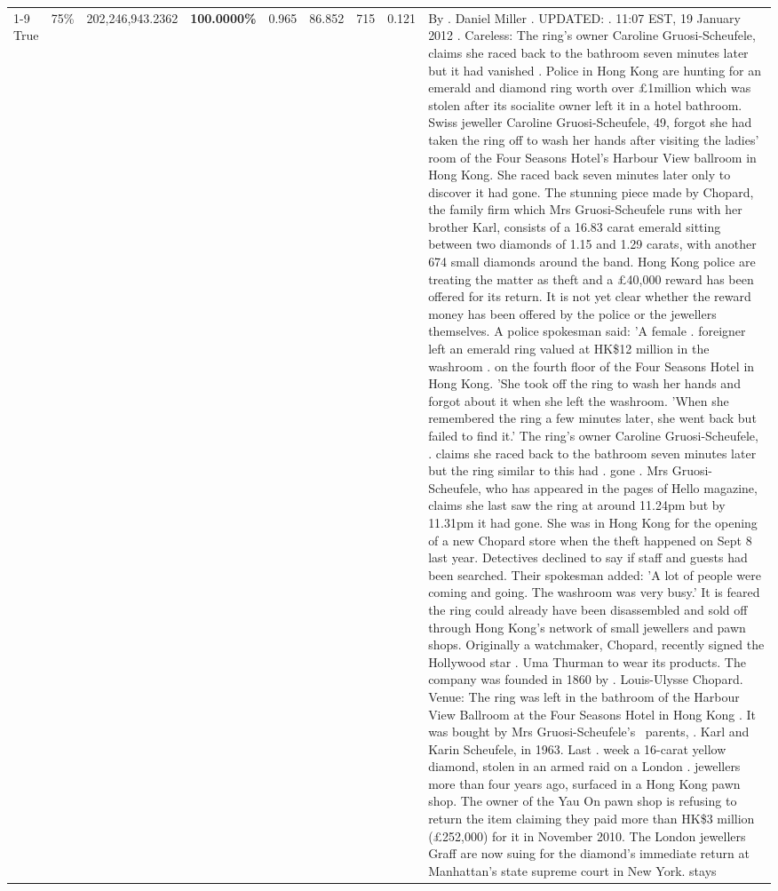 \begin{table}[H]
\begin{tabular}{lllrlllll}
\cline{1-9} \cline{2-9}
True & 75\% & 202,246,943.2362 & \bfseries \color{red} 100.0000\% & 0.965 & 86.852 & 715 & 0.121 & By . Daniel Miller . UPDATED: . 11:07 EST, 19 January 2012 . Careless: The ring's owner Caroline Gruosi-Scheufele, claims she raced back to the bathroom seven minutes later but it had vanished . Police in Hong Kong are hunting for an emerald and diamond ring worth over £1million which was stolen after its socialite owner left it in a hotel bathroom. Swiss jeweller Caroline Gruosi-Scheufele, 49, forgot she had taken the ring off to wash her hands after visiting the ladies' room of the Four Seasons Hotel's Harbour View ballroom in Hong Kong. She raced back seven minutes later only to discover it had gone. The stunning piece made by Chopard, the family firm which Mrs Gruosi-Scheufele runs with her brother Karl, consists of a 16.83 carat emerald sitting between two diamonds of 1.15 and 1.29 carats, with another 674 small diamonds around the band. Hong Kong police are treating the matter as theft and a £40,000 reward has been offered for its return. It is not yet clear whether the reward money has been offered by the police or the jewellers themselves. A police spokesman said: 'A female . foreigner left an emerald ring valued at HK\$12 million in the washroom . on the fourth floor of the Four Seasons Hotel in Hong Kong. 'She took off the ring to wash her hands and forgot about it when she left the washroom. 'When she remembered the ring a few minutes later, she went back but failed to find it.' The ring's owner Caroline Gruosi-Scheufele, . claims she raced back to the bathroom seven minutes later but the ring similar to this had . gone . Mrs Gruosi-Scheufele, who has appeared in the pages of Hello magazine, claims she last saw the ring at around 11.24pm but by 11.31pm it had gone. She was in Hong Kong for the opening of a new Chopard store when the theft happened on Sept 8 last year. Detectives declined to say if staff and guests had been searched. Their spokesman added: 'A lot of people were coming and going. The washroom was very busy.' It is feared the ring could already have been disassembled and sold off through Hong Kong's network of small jewellers and pawn shops. Originally a watchmaker, Chopard, recently signed the Hollywood star . Uma Thurman to wear its products. The company was founded in 1860 by . Louis-Ulysse Chopard. Venue: The ring was left in the bathroom of the Harbour View Ballroom at the Four Seasons Hotel in Hong Kong . It was bought by Mrs Gruosi-Scheufele's  parents, . Karl and Karin Scheufele, in 1963. Last . week a 16-carat yellow diamond, stolen in an armed raid on a London . jewellers more than four years ago, surfaced in a Hong Kong pawn shop. The owner of the Yau On pawn shop is refusing to return the item claiming they paid more than HK\$3 million (£252,000) for it in November 2010. The London jewellers Graff are now suing for the diamond’s immediate return at Manhattan’s state supreme court in New York. stays \\

\end{tabular}
\end{table}
